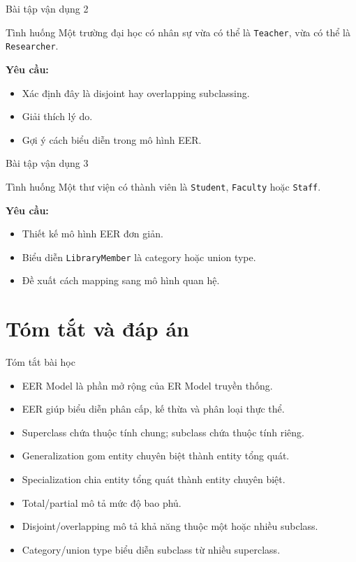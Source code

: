\documentclass[aspectratio=169,11pt]{beamer}
\newcommand{\codeword}[1]{\texttt{#1}}
\begin{document}
\begin{frame}{Bài tập vận dụng 2}
\begin{block}{Tình huống}
Một trường đại học có nhân sự vừa có thể là \codeword{Teacher}, vừa có thể là \codeword{Researcher}.
\end{block}

\textbf{Yêu cầu:}
\begin{itemize}
    \item Xác định đây là disjoint hay overlapping subclassing.
    \item Giải thích lý do.
    \item Gợi ý cách biểu diễn trong mô hình EER.
\end{itemize}
\end{frame}

\begin{frame}{Bài tập vận dụng 3}
\begin{block}{Tình huống}
Một thư viện có thành viên là \codeword{Student}, \codeword{Faculty} hoặc \codeword{Staff}.
\end{block}

\textbf{Yêu cầu:}
\begin{itemize}
    \item Thiết kế mô hình EER đơn giản.
    \item Biểu diễn \codeword{LibraryMember} là category hoặc union type.
    \item Đề xuất cách mapping sang mô hình quan hệ.
\end{itemize}
\end{frame}

\section{Tóm tắt và đáp án}

\begin{frame}{Tóm tắt bài học}
\begin{itemize}
    \item EER Model là phần mở rộng của ER Model truyền thống.
    \item EER giúp biểu diễn phân cấp, kế thừa và phân loại thực thể.
    \item Superclass chứa thuộc tính chung; subclass chứa thuộc tính riêng.
    \item Generalization gom entity chuyên biệt thành entity tổng quát.
    \item Specialization chia entity tổng quát thành entity chuyên biệt.
    \item Total/partial mô tả mức độ bao phủ.
    \item Disjoint/overlapping mô tả khả năng thuộc một hoặc nhiều subclass.
    \item Category/union type biểu diễn subclass từ nhiều superclass.
\end{itemize}
\end{frame}
\end{document}
